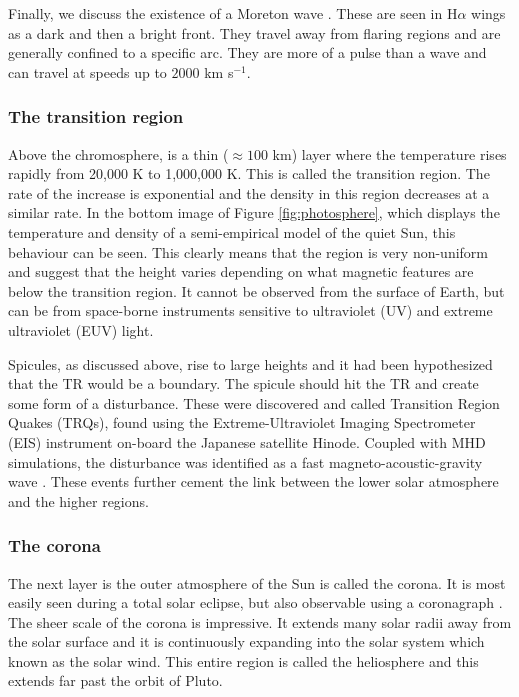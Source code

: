     Finally, we discuss the existence of a Moreton wave \citep{1960AJ.....65U.494M}.
    These are seen in H$\alpha$ wings as a dark and then a bright front.
    They travel away from flaring regions and are generally confined to a specific arc.
    They are more of a pulse than a wave and can travel at speeds up to $2000$ km s$^{-1}$.
            
\subsubsection{The transition region}

    Above the chromosphere, is a thin ($\approx100$ km) layer where the temperature rises rapidly from 20,000 K to 1,000,000 K.
    This is called the transition region.
    The rate of the increase is exponential and the density in this region decreases at a similar rate.
    In the bottom image of Figure \ref{fig:photosphere}, which displays the temperature and density of a semi-empirical model of the quiet Sun, this behaviour can be seen.
    This clearly means that the region is very non-uniform and \cite{tian2009solar} suggest that the height varies depending on what magnetic features are below the transition region.
    It cannot be observed from the surface of Earth, but can be from space-borne instruments sensitive to ultraviolet (UV) and extreme ultraviolet (EUV) light.
    
    Spicules, as discussed above, rise to large heights and it had been hypothesized that the TR would be a boundary.
    The spicule should hit the TR and create some form of a disturbance.
    These were discovered and called Transition Region Quakes (TRQs), found using the Extreme-Ultraviolet Imaging Spectrometer (EIS) instrument on-board the Japanese satellite Hinode.
    Coupled with MHD simulations, the disturbance was identified as a fast magneto-acoustic-gravity wave \citep{0004-637X-743-1-14}.
    These events further cement the link between the lower solar atmosphere and the higher regions.
    
\subsubsection{The corona}
\label{corona}

    The next layer is the outer atmosphere of the Sun is called the corona.
    It is most easily seen during a total solar eclipse, but also observable using a coronagraph \citep{markus2004physics}.
    The sheer scale of the corona is impressive.
    It extends many solar radii away from the solar surface and it is continuously expanding into the solar system which known as the solar wind.
    This entire region is called the heliosphere and this extends far past the orbit of Pluto.
    

